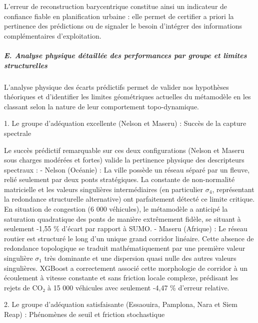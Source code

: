 \documentclass[10pt, a4paper]{article}
\begin{document}
L'erreur de reconstruction barycentrique constitue ainsi un indicateur
de confiance fiable en planification urbaine : elle permet de certifier
a priori la pertinence des prédictions ou de signaler le besoin
d'intégrer des informations complémentaires d'exploitation.

\subparagraph{E. Analyse physique détaillée des performances par groupe
et limites
structurelles}\label{e.-analyse-physique-duxe9tailluxe9e-des-performances-par-groupe-et-limites-structurelles}

L'analyse physique des écarts prédictifs permet de valider nos
hypothèses théoriques et d'identifier les limites géométriques actuelles
du métamodèle en les classant selon la nature de leur comportement
topo-dynamique.

1. Le groupe d'adéquation excellente (Nelson et Maseru) : Succès de la
capture spectrale

Le succès prédictif remarquable sur ces deux configurations (Nelson et
Maseru sous charges modérées et fortes) valide la pertinence physique
des descripteurs spectraux : - Nelson (Océanie) : La ville possède un
réseau séparé par un fleuve, relié seulement par deux ponts
stratégiques. La constante de non-normalité matricielle et les valeurs
singulières intermédiaires (en particulier \(\sigma_4\), représentant la
redondance structurelle alternative) ont parfaitement détecté ce limite
critique. En situation de congestion (6 000 véhicules), le métamodèle a
anticipé la saturation quadratique des ponts de manière extrêmement
fidèle, se situant à seulement -1,55 \% d'écart par rapport à SUMO. -
Maseru (Afrique) : Le réseau routier est structuré le long d'un unique
grand corridor linéaire. Cette absence de redondance topologique se
traduit mathématiquement par une première valeur singulière \(\sigma_1\)
très dominante et une dispersion quasi nulle des autres valeurs
singulières. XGBoost a correctement associé cette morphologie de
corridor à un écoulement à vitesse constante et sans friction locale
complexe, prédisant les rejets de CO₂ à 15 000 véhicules avec seulement
-4,47 \% d'erreur relative.

2. Le groupe d'adéquation satisfaisante (Essaouira, Pamplona, Nara et
Siem Reap) : Phénomènes de seuil et friction stochastique
\end{document}
